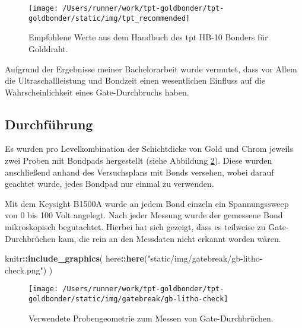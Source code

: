 \documentclass[
  paper=a4,
  ,captions=tableheading
]{scrartcl}
\newenvironment{Shaded}{\begin{snugshade}}{\end{snugshade}}
\newcommand{\KeywordTok}[1]{\textcolor[rgb]{0.13,0.29,0.53}{\textbf{#1}}}
\newcommand{\NormalTok}[1]{#1}
\newcommand{\OperatorTok}[1]{\textcolor[rgb]{0.81,0.36,0.00}{\textbf{#1}}}
\newcommand{\StringTok}[1]{\textcolor[rgb]{0.31,0.60,0.02}{#1}}
\begin{document}
\begin{figure}

{\centering \texttt{[image: /Users/runner/work/tpt-goldbonder/tpt-goldbonder/static/img/tpt\_recommended]} 

}

\caption{Empfohlene Werte aus dem Handbuch des tpt HB-10 Bonders für Golddraht.}\label{fig:recommended-values}
\end{figure}

Aufgrund der Ergebnisse meiner Bachelorarbeit wurde vermutet, dass vor Allem die Ultraschallleistung und Bondzeit einen wesentlichen Einfluss auf die Wahrscheinlichkeit eines Gate-Durchbruchs haben.

\hypertarget{durchfuxfchrung}{%
\subsection{Durchführung}\label{durchfuxfchrung}}

Es wurden pro Levelkombination der Schichtdicke von Gold und Chrom jeweils zwei Proben mit Bondpads hergestellt (siehe Abbildung \ref{fig:screening-litho}). Diese wurden anschließend anhand des Versuchsplans mit Bonds versehen, wobei darauf geachtet wurde, jedes Bondpad nur einmal zu verwenden.

Mit dem Keysight B1500A wurde an jedem Bond einzeln ein Spannungssweep von 0 bis 100 Volt angelegt. Nach jeder Messung wurde der gemessene Bond mikroskopisch begutachtet. Hierbei hat sich gezeigt, dass es teilweise zu Gate-Durchbrüchen kam, die rein an den Messdaten nicht erkannt worden wären.

\begin{Shaded}
\begin{Highlighting}[]
\NormalTok{knitr}\OperatorTok{::}\KeywordTok{include_graphics}\NormalTok{(}
\NormalTok{  here}\OperatorTok{::}\KeywordTok{here}\NormalTok{(}\StringTok{"static/img/gatebreak/gb-litho-check.png"}\NormalTok{)}
\NormalTok{)}
\end{Highlighting}
\end{Shaded}

\begin{figure}

{\centering \texttt{[image: /Users/runner/work/tpt-goldbonder/tpt-goldbonder/static/img/gatebreak/gb-litho-check]} 

}

\caption{Verwendete Probengeometrie zum Messen von Gate-Durchbrüchen.}\label{fig:screening-litho}
\end{figure}
\end{document}
